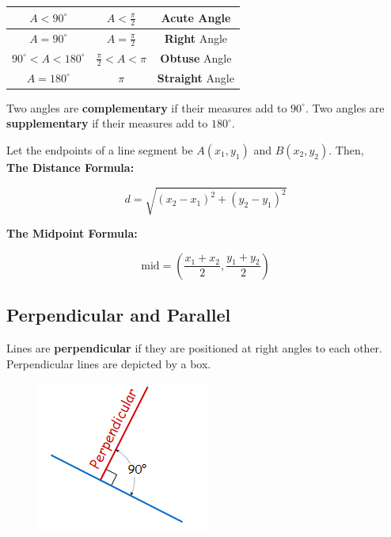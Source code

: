         \begin{center}
            \begin{tabular}{|c|c|c|}
                \hline
                $A<90^\circ$ & $A<\frac{\pi}{2}$ & \textbf{Acute} Angle \\
                \hline
                $A=90^\circ$ & $A=\frac{\pi}{2}$ & \textbf{Right} Angle \\
                \hline
                $90^\circ < A < 180^\circ$ & $\frac{\pi}{2} < A < \pi$ &\textbf{Obtuse} Angle \\
                \hline
                $A=180^\circ$ & $\pi$ & \textbf{Straight} Angle \\
                \hline
            \end{tabular}
        \end{center}

        \noindent Two angles are \textbf{complementary} if their measures add to $90^\circ$.
        Two angles are \textbf{supplementary} if their measures add to $180^\circ$.

        \noindent Let the endpoints of a line segment be $A(x_1, y_1)$ and $B(x_2, y_2)$. Then, \\

        \noindent \color{purple} \textbf{The Distance Formula:} \color{black}

        \begin{equation*}
            d=\sqrt{(x_2-x_1)^2+(y_2-y_1)^2}
        \end{equation*}

        \noindent \color{purple} \textbf{The Midpoint Formula:} \color{black}

        \begin{equation*}
            \text{mid}=\left(\frac{x_1+x_2}{2},\frac{y_1+y_2}{2}\right)
        \end{equation*}



    \subsection{Perpendicular and Parallel}
        Lines are \textbf{perpendicular} if they are positioned at right angles to each other.
        Perpendicular lines are depicted by a box. \\

        \begin{figure} [hbt!]
            \centering
            \includegraphics[scale = 0.6] {Resources/Unit1Basics/perpendicular.PNG}
        \end{figure}

